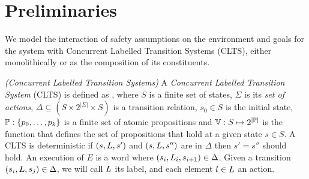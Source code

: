 \section{Preliminaries}

We model the interaction of safety assumptions on the environment and goals for the system with Concurrent Labelled Transition Systems (CLTS), either monolithically or as the composition of its constituents. 


\begin{definition}
	\label{def:CLTS} \emph{(Concurrent Labelled Transition Systems)} 
	A \emph{Concurrent Labelled Transition System} (CLTS) is defined as 
	\cltsDef, 
	where $S$ is a finite set of states, $\Sigma$ is its {\em set of actions}, $\Delta \subseteq (S \times 2^{|\Sigma|} \times S)$ is a transition relation, $s_0 \in S$ is the initial state,
	$\mathbb{P} : \{p_0,\ldots,p_k\}$ is a finite set of atomic 
	propositions and $\mathbb{V} : S \mapsto  2^{|\mathbb{P}|}$ is the function that defines the set of propositions that hold at a given state $s \in S$.  
	A CLTS is deterministic if $(s,L,s')$ and $(s,L,s'')$ are in $\Delta$ then $s'=s''$ should hold.
	An execution of $E$ is a word \executionDef where $(s_i, L_i, s_{i+1}) \in \Delta$. 
	Given a transition $(s_i, L, s_j) \in \Delta$, we will call $L$ its label, and each element $l \in L$ an action.
\end{definition}



